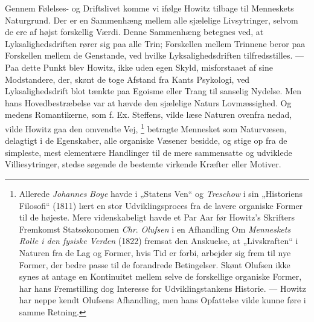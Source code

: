 \documentclass[12pt,a4paper,openany]{book}
\newcommand{\opage}[1]{\marginnote{\footnotesize\textit{[#1]}}}
\begin{document}
Gennem Følelses- og Driftslivet komme vi ifølge Howitz tilbage til Menneskets
Naturgrund. Der er en Sammenhæng mellem alle sjælelige Livsytringer, selvom de
ere af højst forskellig Værdi. Denne Sammenhæng betegnes ved, at
Lyksalighedsdriften rører sig paa alle Trin; Forskellen mellem Trinnene beror
paa Forskellen mellem de Genstande, ved hvilke Lyksalighedsdriften
tilfredsstilles. --- Paa dette Punkt blev Howitz, ikke uden egen Skyld,
misforstaaet af sine Modstandere, der, skønt de toge Afstand fra Kants
Psykologi, ved Lyksalighedsdrift blot tænkte paa Egoisme eller Trang til
sanselig Nydelse. Men hans Hovedbestræbelse var at hævde
\setcounter{footnote}{0}%
\opage{85}den sjælelige Naturs Lovmæssighed. Og medens Romantikerne, som f. Ex.
Steffens, vilde læse Naturen ovenfra nedad, vilde Howitz gaa den omvendte Vej,%
\footnote[1]{Allerede \emph{Johannes} \emph{Boye} havde i „Statens Ven“ og
\emph{Treschow} i sin „Historiens Filosofi“ (1811) lært en stor
Udviklingsproces fra de lavere organiske Former til de højeste. Mere
videnskabeligt havde et Par Aar før Howitz's Skrifters Fremkomst Statsøkonomen
\emph{Chr}. \emph{Olufsen} i en Afhandling Om \textit{Menneskets Rolle i den
fysiske Verden} (1822) fremsat den Anskuelse, at „Livskraften“ i Naturen fra de
Lag og Former, hvis Tid er forbi, arbejder sig frem til nye Former, der bedre
passe til de forandrede Betingelser. Skønt Olufsen ikke synes at antage en
Kontinuitet mellem selve de forskellige organiske Former, har hans Fremstilling
dog Interesse for Udviklingstankens Historie. --- Howitz har neppe kendt
Olufsens Afhandling, men hans Opfattelse vilde kunne føre i samme Retning.}
betragte Mennesket som Naturvæsen, delagtigt i de Egenskaber, alle organiske
Væsener besidde, og stige op fra de simpleste, mest elementære Handlinger til
de mere sammensatte og udviklede Villiesytringer, stedse søgende de bestemte
virkende Kræfter eller Motiver.
\end{document}
